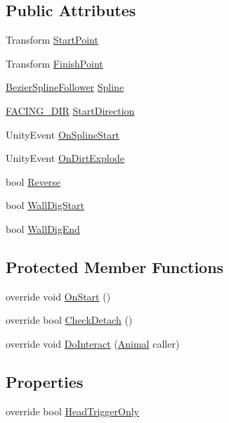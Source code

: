 \subsection*{Public Attributes}
\begin{DoxyCompactItemize}
\item 
Transform \mbox{\hyperlink{class_dig_a03d78ff0b4137ed67c431c84f6cdc17e}{Start\+Point}}
\item 
Transform \mbox{\hyperlink{class_dig_abe73eea22eaad35e4e5e1d5d358449d9}{Finish\+Point}}
\item 
\mbox{\hyperlink{class_bezier_spline_follower}{Bezier\+Spline\+Follower}} \mbox{\hyperlink{class_dig_accc036a410b9deba82251868996985ac}{Spline}}
\item 
\mbox{\hyperlink{_animal_8cs_a57d10208ebba781ae206546ada2002b6}{F\+A\+C\+I\+N\+G\+\_\+\+D\+IR}} \mbox{\hyperlink{class_dig_a1d6e052403f935b802289c4089818dd9}{Start\+Direction}}
\item 
Unity\+Event \mbox{\hyperlink{class_dig_a81532022107f8a49340a38600d73f03e}{On\+Spline\+Start}}
\item 
Unity\+Event \mbox{\hyperlink{class_dig_a02ef58f6d518aa38c5a21cb0409738e7}{On\+Dirt\+Explode}}
\item 
bool \mbox{\hyperlink{class_dig_a27228504e869fda59d4bafed8c1a7b40}{Reverse}}
\item 
bool \mbox{\hyperlink{class_dig_a34e2de7c2acdaa8167f20609590d6b30}{Wall\+Dig\+Start}}
\item 
bool \mbox{\hyperlink{class_dig_a31ff02a0fcc0aa163ca780e5fa19b300}{Wall\+Dig\+End}}
\end{DoxyCompactItemize}
\subsection*{Protected Member Functions}
\begin{DoxyCompactItemize}
\item 
override void \mbox{\hyperlink{class_dig_a4363c202ea7096a10548d4fc5cb53c70}{On\+Start}} ()
\item 
override bool \mbox{\hyperlink{class_dig_abec7f4de75d9d61991eca406c402fb51}{Check\+Detach}} ()
\item 
override void \mbox{\hyperlink{class_dig_a1b5c5ca71b632a658f9f1a0bd5e40658}{Do\+Interact}} (\mbox{\hyperlink{class_animal}{Animal}} caller)
\end{DoxyCompactItemize}
\subsection*{Properties}
\begin{DoxyCompactItemize}
\item 
override bool \mbox{\hyperlink{class_dig_a4bd8b131556afd7267d3da7de9dbe923}{Head\+Trigger\+Only}}
\end{DoxyCompactItemize}
